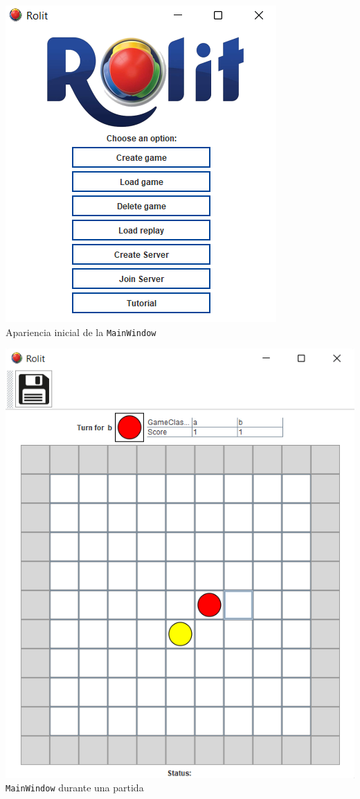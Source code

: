 \documentclass[../DocumentoOficial.tex]{subfiles}
\begin{document}
\begin{center}
\includegraphics[scale=0.9]{mainwindowfinal.png}\\
Apariencia inicial de la \texttt{MainWindow}
\end{center}

\begin{center}
\includegraphics[scale=0.7]{partida-sprint-6.png}\\
\texttt{MainWindow} durante una partida
\end{center}
\end{document}

